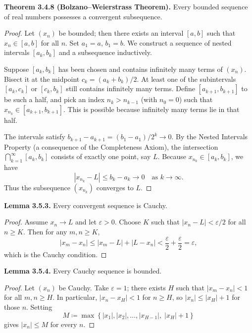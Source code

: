 \documentclass[12pt,a4paper]{article}
\theoremstyle{definition}
\newcommand{\eps}{\varepsilon}
\newcommand{\abs}[1]{\left\lvert#1\right\rvert}
\newcommand{\set}[1]{\left\{#1\right\}}
\begin{document}
\textbf{Theorem 3.4.8 (Bolzano–Weierstrass Theorem).} Every bounded sequence of real numbers possesses a convergent subsequence.

\begin{proof}
Let \((x_n)\) be bounded; then there exists an interval \([a,b]\) such that \(x_n\in[a,b]\) for all \(n\). Set \(a_1=a\), \(b_1=b\). We construct a sequence of nested intervals \([a_k,b_k]\) and a subsequence inductively.

Suppose \([a_k,b_k]\) has been chosen and contains infinitely many terms of \((x_n)\). Bisect it at the midpoint \(c_k = (a_k+b_k)/2\). At least one of the subintervals \([a_k,c_k]\) or \([c_k,b_k]\) still contains infinitely many terms. Define \([a_{k+1},b_{k+1}]\) to be such a half, and pick an index \(n_k > n_{k-1}\) (with \(n_0=0\)) such that \(x_{n_k}\in[a_{k+1},b_{k+1}]\). This is possible because infinitely many terms lie in that half.

The intervals satisfy \(b_{k+1}-a_{k+1} = (b_1-a_1)/2^k \to 0\). By the Nested Intervals Property (a consequence of the Completeness Axiom), the intersection \(\bigcap_{k=1}^{\infty}[a_k,b_k]\) consists of exactly one point, say \(L\). Because \(x_{n_k}\in[a_k,b_k]\), we have
\[
\abs{x_{n_k}-L} \le b_k-a_k \to 0 \quad\text{as } k\to\infty.
\]
Thus the subsequence \((x_{n_k})\) converges to \(L\).
\end{proof}

\textbf{Lemma 3.5.3.} Every convergent sequence is Cauchy.

\begin{proof}
Assume \(x_n\to L\) and let \(\eps>0\). Choose \(K\) such that \(\abs{x_n-L}<\eps/2\) for all \(n\ge K\). Then for any \(m,n\ge K\),
\[
\abs{x_m-x_n} \le \abs{x_m-L}+\abs{L-x_n} < \frac{\eps}{2}+\frac{\eps}{2} = \eps,
\]
which is the Cauchy condition.
\end{proof}

\textbf{Lemma 3.5.4.} Every Cauchy sequence is bounded.

\begin{proof}
Let \((x_n)\) be Cauchy. Take \(\eps=1\); there exists \(H\) such that \(\abs{x_m-x_n}<1\) for all \(m,n\ge H\). In particular, \(\abs{x_n-x_H}<1\) for \(n\ge H\), so \(\abs{x_n}\le \abs{x_H}+1\) for those \(n\). Setting
\[
M \coloneqq \max\set{\abs{x_1},\abs{x_2},\dots,\abs{x_{H-1}},\;\abs{x_H}+1}
\]
gives \(\abs{x_n}\le M\) for every \(n\).
\end{proof}
\end{document}
